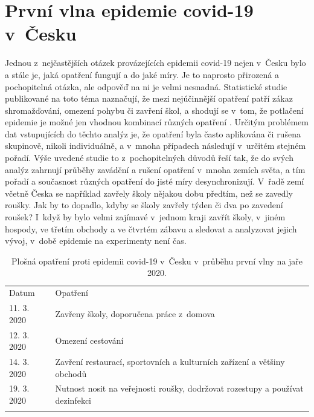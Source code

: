 \section*{První vlna epidemie covid-19 v~Česku}

Jednou z~nejčastějších otázek provázejících epidemii covid-19 nejen v~Česku bylo a stále je, jaká opatření fungují a do jaké míry. Je to naprosto přirozená a pochopitelná otázka, ale odpověď na ni je velmi nesnadná. Statistické studie publikované na toto téma naznačují, že mezi nejúčinnější opatření patří zákaz shromažďování, omezení pohybu či zavření škol, a shodují se v~tom, že potlačení epidemie je možné jen vhodnou kombinací různých opatření \cite{Flaxman_etal2020,Li_etal2020,Haug_etal2020,Liu_etal2021}. Určitým problémem dat vstupujících do těchto analýz je, že opatření byla často aplikována či rušena skupinově, nikoli individuálně, a v~mnoha případech následují v~určitém stejném pořadí. Výše uvedené studie to z~pochopitelných důvodů řeší tak, že do svých analýz zahrnují průběhy zavádění a rušení opatření v~mnoha zemích světa, a tím pořadí a současnost různých opatření do jisté míry desynchronizují. V~řadě zemí včetně Česka se například zavřely školy nějakou dobu předtím, než se zavedly roušky. Jak by to dopadlo, kdyby se školy zavřely týden či dva po zavedení roušek? I~když by bylo velmi zajímavé v~jednom kraji zavřít školy, v~jiném hospody, ve třetím obchody a ve čtvrtém zábavu a sledovat a analyzovat jejich vývoj, v~době epidemie na experimenty není čas.

\begin{table}[h]
	\begin{center}
	\begin{tabular}{lp{8cm}}
		\hline\noalign{\smallskip}
		Datum & Opatření \\
		\noalign{\smallskip}\hline\noalign{\smallskip}
		11. 3. 2020 & Zavřeny školy, doporučena práce z~domova \\
		12. 3. 2020 & Omezení cestování \\
		14. 3. 2020 & Zavření restaurací, sportovních a kulturních zařízení a většiny obchodů \\ 
		19. 3. 2020 & Nutnost nosit na veřejnosti roušky, dodržovat rozestupy a používat dezinfekci \\
		\noalign{\smallskip}\hline
	\end{tabular}
	\end{center}
	\caption{Plošná opatření proti epidemii covid-19 v~Česku v~průběhu první vlny na jaře 2020.}
	\label{table:interventions}
\end{table}

